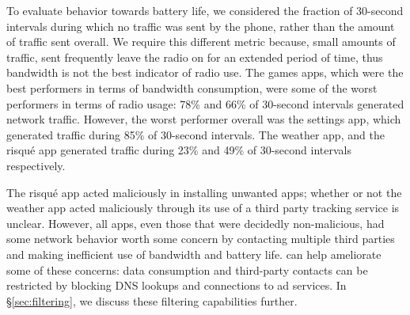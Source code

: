     To evaluate behavior towards battery life, we considered the fraction of 30-second intervals during which no traffic was sent by the phone, rather than the amount of traffic sent overall. 
    We require this different metric because, \eg{} small amounts of traffic, sent frequently leave the radio on for an extended period of time, thus bandwidth is not the best indicator of radio use.
    The games apps, which were the best performers in terms of bandwidth consumption, were some of the worst performers in terms of radio usage: 78\% and 66\% of 30-second intervals generated network traffic.
    However, the worst performer overall was the settings app, which generated traffic during 85\% of 30-second intervals.
    The weather app, and the risqu\'{e} app generated traffic during 23\% and 49\% of 30-second intervals respectively.

    The risqu\'{e} app acted maliciously in installing unwanted apps; whether or not the weather app acted maliciously through its use of a third party tracking service is unclear.
    However, all apps, even those that were decidedly non-malicious, had some network behavior worth some concern by contacting multiple third parties and making inefficient use of bandwidth and battery life.
    \meddle can help ameliorate some of these concerns: data consumption and third-party contacts can be restricted by blocking DNS lookups and connections to ad services. 
    In \S\ref{sec:filtering}, we discuss these filtering capabilities further.

